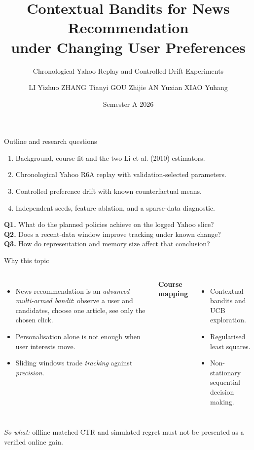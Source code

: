 \documentclass[10pt,aspectratio=169]{beamer}
\title[Hybrid LinUCB aligned reproduction]{Contextual Bandits for News Recommendation\\under Changing User Preferences}
\subtitle{Chronological Yahoo Replay and Controlled Drift Experiments}
\author[LI et al.]{LI Yizhuo \quad ZHANG Tianyi \quad GOU Zhijie \quad AN Yuxian \quad XIAO Yuhang}
\institute{DSC6007 Dynamic Programming and Reinforcement Learning --- Group 14}
\date{Semester A 2026}
\begin{document}

\maketitle

\begin{frame}{Outline and research questions}
\begin{enumerate}
\item Background, course fit and the two Li et al. (2010) estimators.
\item Chronological Yahoo R6A replay with validation-selected parameters.
\item Controlled preference drift with known counterfactual means.
\item Independent seeds, feature ablation, and a sparse-data diagnostic.
\end{enumerate}
\vspace{4pt}
\textbf{Q1.} What do the planned policies achieve on the logged Yahoo slice?\\
\textbf{Q2.} Does a recent-data window improve tracking under known change?\\
\textbf{Q3.} How do representation and memory size affect that conclusion?
\end{frame}

\begin{frame}{Why this topic}
\begin{columns}
\begin{itemize}
\item News recommendation is an \emph{advanced multi-armed bandit}: observe a user and candidates, choose one article, see only the chosen click.
\item Personalisation alone is not enough when user interests move.
\item Sliding windows trade \emph{tracking} against \emph{precision}.
\end{itemize}
\textbf{Course mapping}
\begin{itemize}
\item Contextual bandits and UCB exploration.
\item Regularised least squares.
\item Non-stationary sequential decision making.
\end{itemize}
\end{columns}
\vspace{6pt}
\emph{So what:} offline matched CTR and simulated regret must not be presented as a verified online gain.
\end{frame}
\end{document}
